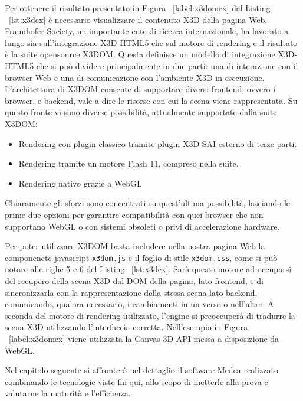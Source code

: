 Per ottenere il risultato presentato in Figura ~\ref{label:x3domex} dal Listing ~\ref{lst:x3dex} è \mbox{necessario} visualizzare il contenuto X3D della pagina Web. 
Fraunhofer Society, un importante ente di ricerca internazionale, ha lavorato a lungo sia sull'integrazione X3D-HTML5 che sul motore di rendering e il risultato è la suite opensource X3DOM. Questa definisce un modello di integrazione X3D-HTML5 che si può dividere principalmente in due parti: una di interazione con il browser Web e una di comunicazione con l'ambiente X3D in esecuzione. L'architettura di X3DOM consente di supportare diversi frontend, ovvero i browser, e backend, vale a dire le risorse con cui la scena viene rappresentata. Su questo fronte vi sono diverse possibilità, attualmente supportate dalla suite X3DOM: 
\begin{itemize}
	\item Rendering con plugin classico tramite plugin X3D-SAI esterno di terze parti.
	\item Rendering tramite un motore Flash 11, compreso nella suite.
    \item Rendering nativo grazie a WebGL
\end{itemize}
Chiaramente gli sforzi sono concentrati su quest'ultima possibilità, lasciando le prime due opzioni per garantire compatibilità con quei browser che non supportano WebGL o con sistemi obsoleti o privi di accelerazione hardware.

Per poter utilizzare X3DOM basta includere nella nostra pagina Web la componenete javascript \texttt{x3dom.js} e il foglio di stile \texttt{x3dom.css}, come si può notare alle righe 5 e 6 del Listing ~\ref{lst:x3dex}. Sarà questo motore ad occuparsi del recupero della scena X3D dal DOM della pagina, lato frontend, e di sincronizzarla con la rappresentazione della stessa scena lato backend, comunicando, qualora necessario, i cambiamenti in un verso o nell'altro. A seconda del motore di rendering utilizzato, l'engine si preoccuperà di tradurre la scena X3D utilizzando l'interfaccia corretta. Nell'esempio in Figura ~\ref{label:x3domex} viene utilizzata la Canvas 3D API messa a disposizione da WebGL.

Nel capitolo seguente si affronter\`{a} nel dettaglio il software Medea realizzato combinando le tecnologie viste fin qui, allo scopo di metterle alla prova e valutarne la maturità e l'efficienza.
